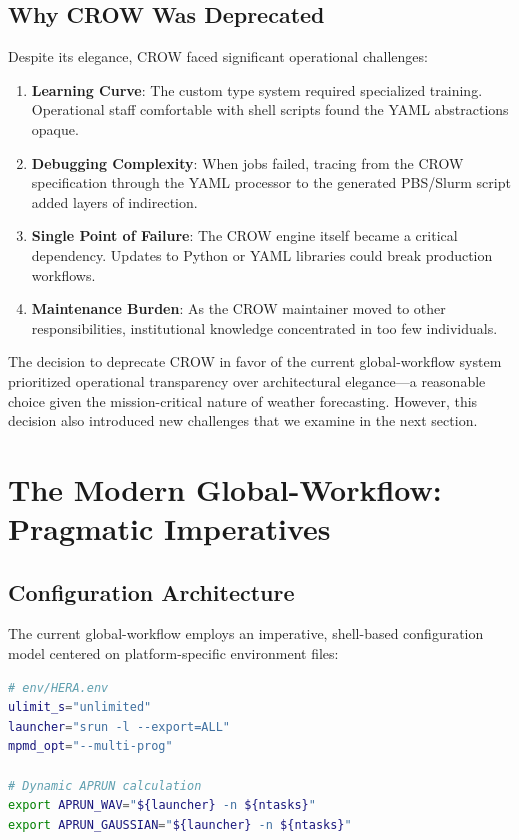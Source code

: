\documentclass[11pt,twocolumn]{article}
\begin{document}
\subsection{Why CROW Was Deprecated}

Despite its elegance, CROW faced significant operational challenges:

\begin{enumerate}
    \item \textbf{Learning Curve}: The custom type system required specialized training. Operational staff comfortable with shell scripts found the YAML abstractions opaque.
    
    \item \textbf{Debugging Complexity}: When jobs failed, tracing from the CROW specification through the YAML processor to the generated PBS/Slurm script added layers of indirection.
    
    \item \textbf{Single Point of Failure}: The CROW engine itself became a critical dependency. Updates to Python or YAML libraries could break production workflows.
    
    \item \textbf{Maintenance Burden}: As the CROW maintainer moved to other responsibilities, institutional knowledge concentrated in too few individuals.
\end{enumerate}

The decision to deprecate CROW in favor of the current global-workflow system prioritized operational transparency over architectural elegance---a reasonable choice given the mission-critical nature of weather forecasting. However, this decision also introduced new challenges that we examine in the next section.

\section{The Modern Global-Workflow:\\ Pragmatic Imperatives}

\subsection{Configuration Architecture}

The current global-workflow employs an imperative, shell-based configuration model centered on platform-specific environment files:

\begin{lstlisting}[language=Bash, caption={Modern HERA Environment Configuration}]
# env/HERA.env
ulimit_s="unlimited"
launcher="srun -l --export=ALL"
mpmd_opt="--multi-prog"

# Dynamic APRUN calculation
export APRUN_WAV="${launcher} -n ${ntasks}"
export APRUN_GAUSSIAN="${launcher} -n ${ntasks}"
\end{lstlisting}
\end{document}
